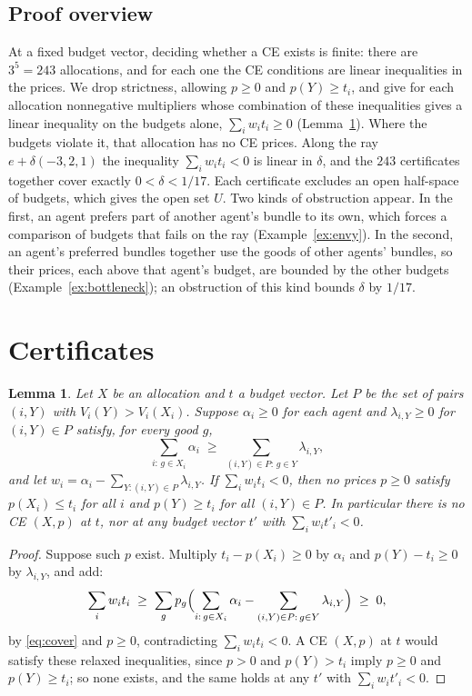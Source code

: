 \documentclass[11pt]{article}
\newtheorem{lemma}[theorem]{Lemma}
\theoremstyle{definition}
\theoremstyle{remark}
\begin{document}
\subsection{Proof overview}
At a fixed budget vector, deciding whether a CE exists is finite: there
are $3^5=243$ allocations, and for each one the CE conditions are linear
inequalities in the prices. We drop strictness, allowing $p\ge0$ and
$p(Y)\ge t_i$, and give for each allocation nonnegative multipliers whose
combination of these inequalities gives a linear inequality on the budgets
alone, $\sum_i w_it_i\ge0$ (Lemma~\ref{lem:farkas}). Where the budgets
violate it, that allocation has no CE prices. Along the ray
$e+\delta(-3,2,1)$ the inequality $\sum_iw_it_i<0$ is linear in $\delta$,
and the $243$ certificates together cover exactly $0<\delta<1/17$. Each
certificate excludes an open half-space of budgets, which gives the open
set $U$. Two kinds of obstruction appear. In the first, an agent prefers
part of another agent's bundle to its own, which forces a comparison of
budgets that fails on the ray (Example~\ref{ex:envy}). In the second, an
agent's preferred bundles together use the goods of other agents' bundles,
so their prices, each above that agent's budget, are bounded by the other
budgets (Example~\ref{ex:bottleneck}); an obstruction of this kind bounds
$\delta$ by $1/17$.

\section{Certificates}

\begin{lemma}\label{lem:farkas}
Let $X$ be an allocation and $t$ a budget vector. Let $P$ be the set of
pairs $(i,Y)$ with $V_i(Y)>V_i(X_i)$. Suppose $\alpha_i\ge0$ for each agent
and $\lambda_{i,Y}\ge0$ for $(i,Y)\in P$ satisfy, for every good $g$,
\begin{equation}\label{eq:cover}
  \sum_{i:\,g\in X_i}\alpha_i\;\ge\;\sum_{(i,Y)\in P:\,g\in Y}\lambda_{i,Y},
\end{equation}
and let $w_i=\alpha_i-\sum_{Y:(i,Y)\in P}\lambda_{i,Y}$. If
$\sum_iw_it_i<0$, then no prices $p\ge0$ satisfy $p(X_i)\le t_i$ for all
$i$ and $p(Y)\ge t_i$ for all $(i,Y)\in P$. In particular there is no CE
$(X,p)$ at $t$, nor at any budget vector $t'$ with $\sum_iw_it'_i<0$.
\end{lemma}

\begin{proof}
Suppose such $p$ exist. Multiply $t_i-p(X_i)\ge0$ by $\alpha_i$ and
$p(Y)-t_i\ge0$ by $\lambda_{i,Y}$, and add:
\[
  \sum_iw_it_i\;\ge\;\sum_g p_g\Bigl(\sum_{i:\,g\in X_i}\alpha_i-\sum_{(i,Y)\in P:\,g\in Y}\lambda_{i,Y}\Bigr)\;\ge\;0,
\]
by \eqref{eq:cover} and $p\ge0$, contradicting $\sum_iw_it_i<0$. A CE
$(X,p)$ at $t$ would satisfy these relaxed inequalities, since $p>0$ and
$p(Y)>t_i$ imply $p\ge0$ and $p(Y)\ge t_i$; so none exists, and the same
holds at any $t'$ with $\sum_iw_it'_i<0$.
\end{proof}
\end{document}
